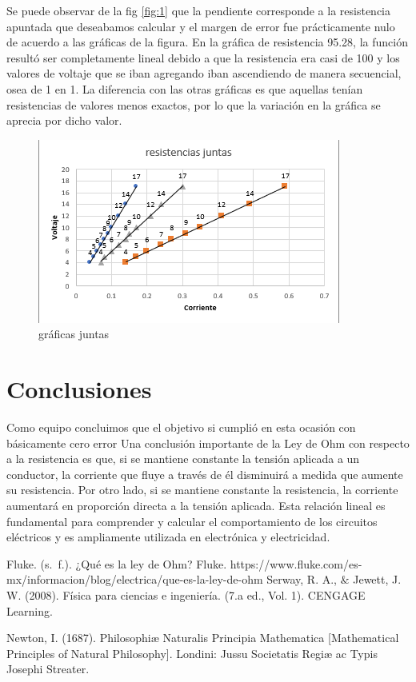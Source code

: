 \documentclass{article}
\begin{document}
Se puede observar de la fig \ref{fig:1}
que la pendiente corresponde a la resistencia apuntada que deseabamos calcular y el margen
de error fue prácticamente nulo de acuerdo a las gráficas de la figura.
En la gráfica de resistencia 95.28, la función resultó ser completamente lineal debido a que la resistencia era casi de 100 y los valores de voltaje que se iban agregando iban ascendiendo de manera secuencial, osea de 1 en 1. La diferencia con las otras gráficas es que aquellas tenían resistencias de valores menos exactos, por lo que la variación en la gráfica se aprecia por dicho valor.
\begin{figure}[H]
    \centering
    \includegraphics[scale=0.6]{../imgs/r1.png}
    \caption{gráficas juntas}
    \label{fig:2}
\end{figure}

\section{Conclusiones}\label{Conclusiones}				%
Como equipo concluimos que el objetivo si cumplió en esta ocasión con básicamente cero error  
Una conclusión importante de la Ley de Ohm con respecto a la resistencia es que, si se mantiene constante la tensión aplicada a un conductor, la corriente que fluye a través de él disminuirá a medida que aumente su resistencia. Por otro lado, si se mantiene constante la resistencia, la corriente aumentará en proporción directa a la tensión aplicada. Esta relación lineal es fundamental para comprender y calcular el comportamiento de los circuitos eléctricos y es ampliamente utilizada en electrónica y electricidad.
\begin{thebibliography}{9}						%
	Fluke. (s. f.). ¿Qué es la ley de Ohm? Fluke. https://www.fluke.com/es-mx/informacion/blog/electrica/que-es-la-ley-de-ohm
	Serway, R. A., $\&$ Jewett, J. W. (2008). Física para ciencias e ingeniería. (7.a
ed., Vol. 1). CENGAGE Learning.

	Newton, I. (1687). Philosophiæ Naturalis Principia Mathematica [Mathematical Principles of Natural Philosophy]. Londini: Jussu Societatis Regiæ ac Typis Josephi Streater.

\end{thebibliography}
\end{document}
